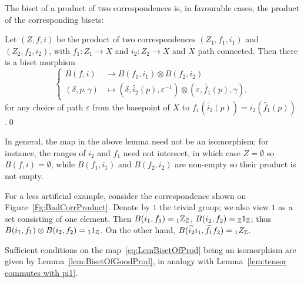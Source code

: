 \documentclass{amsart}
\begin{document}
The biset of a product of two correspondences is, in favourable cases,
the product of the corresponding bisets:
\begin{lem}\label{lem:BisetOfProd}
  Let $(Z,f,i)$ be the product of two correspondences $(Z_1,f_1,i_1)$ and
  $(Z_2,f_2,i_2)$, with $f_1\colon Z_1\to X$ and $i_2\colon Z_2\to X$ and
  $X$ path connected. Then there is a biset morphism
  \begin{equation}\label{eq:LemBisetOfProd}
    \begin{cases}
      B(f,i) &\to B(f_1,i_1)\otimes B(f_2,i_2)\\
      (\delta,p,\gamma) & \mapsto(\delta,\widetilde{i_2}(p),
      \varepsilon^{-1})\otimes (\varepsilon,\widetilde{f_1}(p),\gamma),
    \end{cases}
  \end{equation}
  for any choice of path $\varepsilon$ from the basepoint of $X$ to
  $f_1(\widetilde{i_2}(p))=i_2(\widetilde{f_1}(p))$.\qed
\end{lem}

\begin{exple}
  In general, the map in the above lemma need not be an isomorphism;
  for instance, the ranges of $i_2$ and $f_1$ need not intersect, in
  which case $Z=\emptyset$ so $B(f,i)=\emptyset$, while $B(f_1,i_1)$
  and $B(f_2,i_2)$ are non-empty so their product is not empty.

  For a less artificial example, consider the correspondence shown on
  Figure~\ref{Fg:BadCorrProduct}. Denote by $1$ the trivial group; we
  also view $1$ as a set consisting of one element.  Then
  $B(i_1,f_1)={}_1{\mathbb Z}_{\mathbb Z}$, $B(i_2,f_2)={}_{\mathbb Z} 1_{\mathbb Z}$; thus
  $B(i_1,f_1)\otimes B(i_2,f_2)={}_11_{\mathbb Z} $. On the other hand,
  $B(\widetilde{i_2}i_1,\widetilde{f_1}f_2)={}_1Z_{\mathbb Z}$.

  Sufficient conditions on the map~\eqref{eq:LemBisetOfProd} being an
  isomorphism are given by Lemma~\ref{lem:BisetOfGoodProd}, in analogy
  with Lemma~\ref{lem:tensor commutes with pi1}.
\end{exple}
\end{document}
